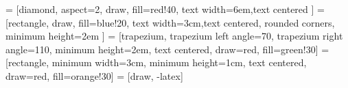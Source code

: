 \usepackage[colorlinks=true,
linkcolor 		= red,
anchorcolor 	= black,
citecolor 		= green,
filecolor 		= cyan,
	\iftoggle{LinksComCores}{%
	}{%
		hidelinks
	}
]{hyperref} %



\usepackage[numbered]{mcode} 		%


\usepackage{caption}
\usepackage{subcaption}
\usepackage{capt-of}

\usepackage{circuitikz}
\usepackage{tikz}

\usepackage{makecell}

\usetikzlibrary{shapes.geometric,arrows.meta}
\usetikzlibrary{positioning}
\usetikzlibrary{calc}
\usetikzlibrary{backgrounds}
\usetikzlibrary{fit}

 = [diamond, aspect=2, draw, fill=red!40, text width=6em,text centered ]
 = [rectangle, draw, fill=blue!20, text width=3cm,text centered, rounded corners, minimum height=2em ]
 = [trapezium, trapezium left angle=70, trapezium right angle=110, minimum height=2em, text centered, draw=red, fill=green!30]
 = [rectangle, minimum width=3cm, minimum height=1cm, text centered, draw=red, fill=orange!30]
 = [draw, -latex]


